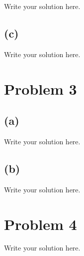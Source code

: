 \documentclass[11pt]{article}
\begin{document}
Write your solution here.

\subsection*{(c)}

Write your solution here.


\section*{Problem 3}

\subsection*{(a)}

Write your solution here.

\subsection*{(b)}

Write your solution here.


\section*{Problem 4}

Write your solution here.

\end{document}
